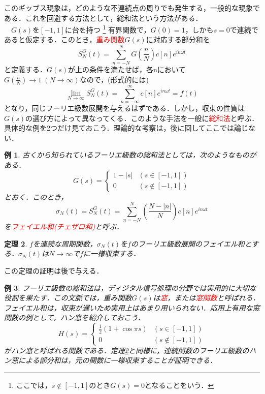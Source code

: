 \documentclass[a4j]{jsbook}
\newtheorem{theorem}{定理}
\newtheorem{example}[theorem]{例}
\numberwithin{theorem}{chapter}  %
\begin{document}
このギッブス現象は，どのような不連続点の周りでも発生する，一般的な現象である．これを回避する方法として，総和法という方法がある．\\
　\(G(s)\)を\([-1, 1]\)に台を持つ
\footnote{ここでは，\(s\notin[-1, 1]\)のとき\(G(s)=0\)となることをいう．
}
有界関数で，\(G(0)=1\)，しかも\(s=0\)で連続であると仮定する．このとき，\textcolor{red}{重み関数}\(G(s)\)に対応する部分和を
\begin{equation*}
    S_N^G(t)=\sum_{n=-N}^N G\left(\frac{n}{N}\right)c[n]e^{in\omega t}
\end{equation*}
と定義する．\(G(s)\)が上の条件を満たせば，各nにおいて\(\displaystyle G\left(\frac{n}{N}\right)\to 1\ (N\to\infty)\)なので，(形式的には)
\begin{equation*}
    \lim_{N\to\infty}S_N^G(t)=\sum_{n=-\infty}^\infty c[n]e^{in\omega t}=f(t)
\end{equation*}
となり，同じフーリエ級数展開を与えるはずである．しかし，収束の性質は\(G(s)\)の選び方によって異なってくる．このような手法を一般に\textcolor{red}{総和法}と呼ぶ．具体的な例を2つだけ見ておこう．理論的な考察は，後に回してここでは論じない．
\begin{example}
\label{ex1-5}
古くから知られているフーリエ級数の総和法としては，次のようなものがある．
\begin{equation*}
    G(s)
    =
    \begin{cases}
    1-|s| & (s\in[-1, 1]) \\
    0 & (s\notin[-1, 1])
    \end{cases}
\end{equation*}
とおく．このとき，
\begin{equation*}
    \sigma_N(t)=S_N^G(t)=\sum_{n=-N}^N\left(\frac{N-|n|}{N}\right)c[n]e^{in\omega t}
\end{equation*}
を\textcolor{red}{フェイエル和(チェザロ和)}と呼ぶ．
\end{example}
\begin{theorem}
\label{th1-14}
\(f\)を連続な周期関数，\(\sigma_N(t)\)を\(f\)のフーリエ級数展開のフェイエル和とする．\(\sigma_N(t)\)は\(N\to\infty\)で\(f\)に一様収束する．
\end{theorem}
この定理の証明は後で与える．
\begin{example}
\label{ex1-6}
フーリエ級数の総和法は，ディジタル信号処理の分野では実用的に大切な役割を果たす．この文脈では，重み関数\(G(s)\)は\textcolor{red}{窓}，または\textcolor{red}{窓関数}と呼ばれる．フェイエル和は，収束が遅いため実用上はあまり用いられない．応用上有用な窓関数の例として，ハン窓を紹介しておこう．
\begin{equation*}
    H(s)
    =
    \begin{cases}
    \frac{1}{2}(1+\cos\pi s) & (s\in[-1, 1]) \\
    0 & (s\notin[-1, 1])
    \end{cases}
\end{equation*}
がハン窓と呼ばれる関数である．定理\ref{th1-14}と同様に，連続関数のフーリエ級数のハン窓による部分和は，元の関数に一様収束することが証明できる．
\end{example}
\end{document}
